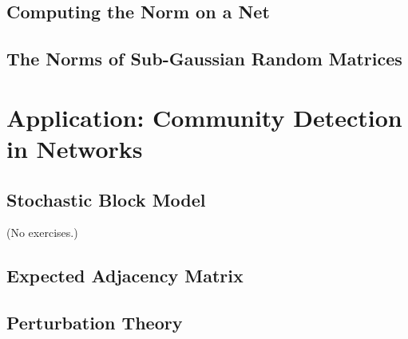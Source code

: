 \documentclass{report}
\theoremstyle{definition}
\newenvironment{exercise}[1]{
  \renewcommand\theexerciseimpl{#1}
  \exerciseimpl
}{\endexerciseimpl}
\begin{document}
\subsection{Computing the Norm on a Net}

\begin{exercise}{4.4.2}
\end{exercise}

\begin{exercise}{4.4.3}
\end{exercise}

\begin{exercise}{4.4.4}
\end{exercise}

\subsection{The Norms of Sub-Gaussian Random Matrices}

\begin{exercise}{4.4.6}
\end{exercise}

\begin{exercise}{4.4.7}
\end{exercise}

\section{Application: Community Detection in Networks}

\subsection{Stochastic Block Model}

(No exercises.)

\subsection{Expected Adjacency Matrix}

\begin{exercise}{4.5.2}
\end{exercise}

\subsection{Perturbation Theory}

\begin{exercise}{4.5.4}
\end{exercise}
\end{document}
